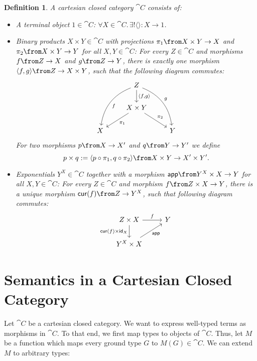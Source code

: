 \documentclass{article}
\newtheorem{defn}{Definition}[section]
\newcommand{\term}{1}
\newcommand{\app}{\mathsf{app}}
\newcommand{\cur}{\mathsf{cur}}
\newcommand{\id}{\mathsf{id}}
\begin{document}
\begin{defn}
    \label{def:ccc}
    A cartesian closed category $\cat{C}$ consists of:
    \begin{itemize}
        \item A terminal object $\term \in \cat{C}$: $\forall X \in \cat{C}.\, \exists! \langle\rangle: X \to \term$.
        \item Binary products $X \times Y \in \cat{C}$ with projections $\pi_1 \from X \times Y \to X$ and $\pi_2 \from X \times Y \to Y$
            for all $X, Y \in \cat{C}$:
            For every $Z \in \cat{C}$ and morphisms $f \from Z \to X$ and $g \from Z \to Y$,
            there is exactly one morphism $\langle f, g \rangle \from Z \to X \times Y$, such that the following diagram commutes:
            \[
                \begin{tikzcd}
                    & Z \arrow[bend right]{ddl}{f} \arrow{d}{\langle f, g \rangle} \arrow[bend left]{ddr}{g} & \\
                    & X \times Y \arrow{dl}{\pi_1} \arrow{dr}{\pi_2} & \\
                    X & & Y
                \end{tikzcd}
            \]
            For two morphisms $p \from X \to X'$ and $q \from Y \to Y'$ we define
            \[ p \times q := \langle p \circ \pi_1, q \circ \pi_2 \rangle \from X \times Y \to X' \times Y'.\]
        \item Exponentials $Y^X \in \cat{C}$ together with a morphism $\app \from Y^X \times X \to Y$ for all $X, Y \in \cat{C}$:
            For every $Z \in \cat{C}$ and morphism $f \from Z \times X \to Y$,
            there is a unique morphism $\cur(f) \from Z \to Y^X$, such that following diagram commutes:
            \[
                \begin{tikzcd}
                    Z \times X \arrow{d}[left]{\cur(f) \times \id_X} \arrow{r}{f} & Y \\
                    Y^X \times X \arrow{ur}[right=7pt, below]{\app}
                \end{tikzcd}
            \]
    \end{itemize}
\end{defn}


\section{Semantics in a Cartesian Closed Category}
\label{sec:sem}

Let $\cat{C}$ be a cartesian closed category.
We want to express well-typed terms as morphisms in $\cat{C}$.
To that end, we first map types to objects of $\cat{C}$.
Thus, let $M$ be a function which maps every ground type $G$ to $M(G) \in \cat{C}$.
We can extend $M$ to arbitrary types:
\end{document}
